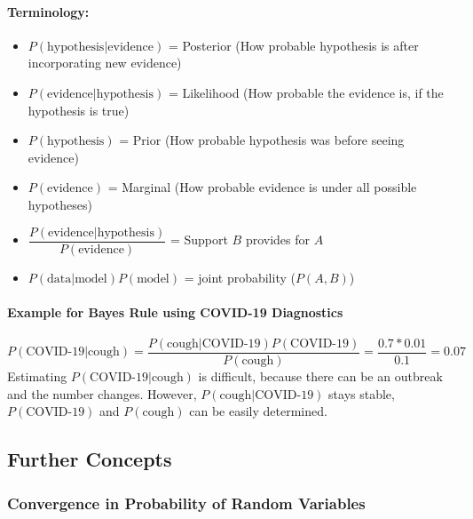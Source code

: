 \documentclass[
]{book}
\begin{document}
\hypertarget{terminology}{%
\paragraph{Terminology:}\label{terminology}}

\begin{itemize}
\item
  \(P(\text{hypothesis}|\text{evidence})\) = Posterior (How probable
  hypothesis is after incorporating new evidence)
\item
  \(P(\text{evidence}|\text{hypothesis})\) = Likelihood (How probable
  the evidence is, if the hypothesis is true)
\item
  \(P(\text{hypothesis})\) = Prior (How probable hypothesis was before
  seeing evidence)
\item
  \(P(\text{evidence})\) = Marginal (How probable evidence is under all
  possible hypotheses)
\item
  \(\dfrac{P(\text{evidence}|\text{hypothesis})}{P(\text{evidence})}\) =
  Support \(B\) provides for \(A\)
\item
  \(P(\text{data}|\text{model})P(\text{model})\) = joint probability
  (\(P(A,B)\))
\end{itemize}

\hypertarget{example-for-bayes-rule-using-covid-19-diagnostics}{%
\paragraph{Example for Bayes Rule using COVID-19 Diagnostics}\label{example-for-bayes-rule-using-covid-19-diagnostics}}

\[P(\text{COVID-19}|\text{cough}) =\dfrac{P(\text{cough}|\text{COVID-19})P(\text{COVID-19})}{P(\text{cough})} = \frac{0.7*0.01}{0.1}=0.07\]
Estimating \(P(\text{COVID-19}|\text{cough})\) is difficult, because there
can be an outbreak and the number changes. However,
\(P(\text{cough}|\text{COVID-19})\) stays stable, \(P(\text{COVID-19})\) and
\(P(\text{cough})\) can be easily determined.

\hypertarget{further-concepts}{%
\subsection{Further Concepts}\label{further-concepts}}

\hypertarget{convergence-in-probability-of-random-variables}{%
\subsubsection{Convergence in Probability of Random Variables}\label{convergence-in-probability-of-random-variables}}
\end{document}
